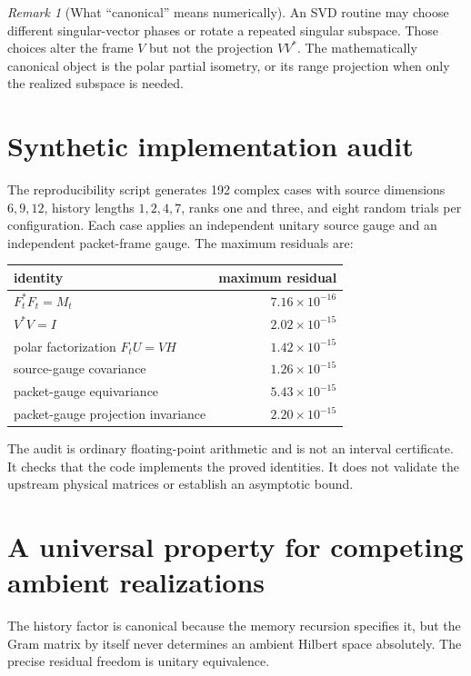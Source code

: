 \documentclass[12pt]{article}
\theoremstyle{definition}
\theoremstyle{remark}
\newtheorem{remark}[theorem]{Remark}
\begin{document}
\begin{remark}[What ``canonical'' means numerically]
An SVD routine may choose different singular-vector phases or rotate a
repeated singular subspace.  Those choices alter the frame $V$ but not the
projection $VV^*$.  The mathematically canonical object is the polar partial
isometry, or its range projection when only the realized subspace is needed.
\end{remark}

\section{Synthetic implementation audit}

The reproducibility script generates 192 complex cases with source dimensions
$6,9,12$, history lengths $1,2,4,7$, ranks one and three, and eight random
trials per configuration.  Each case applies an independent unitary source
gauge and an independent packet-frame gauge.  The maximum residuals are:
\begin{center}
\begin{tabular}{lr}
\toprule
identity & maximum residual\\
\midrule
$F_t^*F_t=M_t$ & $7.16\times10^{-16}$\\
$V^*V=I$ & $2.02\times10^{-15}$\\
polar factorization $F_tU=VH$ & $1.42\times10^{-15}$\\
source-gauge covariance & $1.26\times10^{-15}$\\
packet-gauge equivariance & $5.43\times10^{-15}$\\
packet-gauge projection invariance & $2.20\times10^{-15}$\\
\bottomrule
\end{tabular}
\end{center}
The audit is ordinary floating-point arithmetic and is not an interval
certificate.  It checks that the code implements the proved identities.  It
does not validate the upstream physical matrices or establish an asymptotic
bound.

\section{A universal property for competing ambient realizations}

The history factor is canonical because the memory recursion specifies it,
but the Gram matrix by itself never determines an ambient Hilbert space
absolutely.  The precise residual freedom is unitary equivalence.
\end{document}
